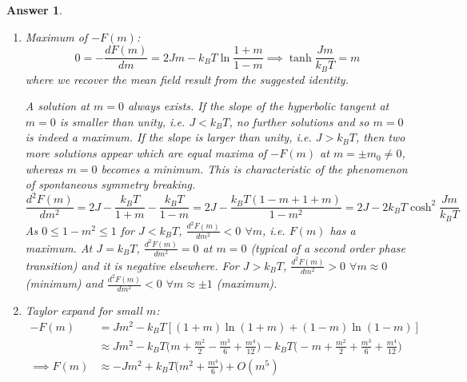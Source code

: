 \documentclass[a4paper]{article}
\newtheorem{ans}{Answer}[section]
\theoremstyle{new}
\begin{document}
\begin{ans}
\begin{enumerate}[label=(\alph*)]
\begin{center}
\end{center}
\item Maximum of $-F(m)$:
$$0=-\frac{dF(m)}{dm}=2Jm-k_BT\ln\frac{1+m}{1-m}\implies\tanh\frac{Jm}{k_BT}=m$$
where we recover the mean field result from the suggested identity.
\begin{center}
\end{center}
A solution at $m=0$ always exists. If the slope of the hyperbolic tangent at $m=0$ is smaller than unity, i.e. $J<k_BT$, no further solutions and so $m=0$ is indeed a maximum. If the slope is larger than unity, i.e. $J>k_BT$, then two more solutions appear which are equal maxima of $-F(m)$ at $m=\pm m_0\neq 0$, whereas $m=0$ becomes a minimum. This is characteristic of the phenomenon of spontaneous symmetry breaking.
$$\frac{d^2F(m)}{dm^2}=2J-\frac{k_BT}{1+m}-\frac{k_BT}{1-m}=2J-\frac{k_BT(1-m+1+m)}{1-m^2}=2J-2k_BT\cosh^2\frac{Jm}{k_BT}$$
As $0\leq 1-m^2\leq 1$ for $J<k_BT$, $\frac{d^2F(m)}{dm^2}<0$ $\forall m$, i.e. $F(m)$ has a maximum. At $J=k_BT$, $\frac{d^2F(m)}{dm^2}=0$ at $m=0$ (typical of a second order phase transition) and it is negative elsewhere. For $J>k_BT$, $\frac{d^2F(m)}{dm^2}>0$ $\forall m\approx 0$ (minimum) and $\frac{d^2F(m)}{dm^2}<0$ $\forall m\approx\pm1$ (maximum).
\item Taylor expand for small $m$:
\begin{align}
    -F(m)&=Jm^2-k_BT[(1+m)\ln(1+m)+(1-m)\ln(1-m)]\nonumber\\&\approx Jm^2-k_BT\bigg(m+\frac{m^2}{2}-\frac{m^3}{6}+\frac{m^4}{12}\bigg)-k_BT\bigg(-m+\frac{m^2}{2}+\frac{m^3}{6}+\frac{m^4}{12}\bigg)\nonumber\\\implies F(m)&\approx-Jm^2+k_BT\bigg(m^2+\frac{m^4}{6}\bigg)+O(m^5)\nonumber

\end{align}
\end{enumerate}
\end{ans}
\end{document}
